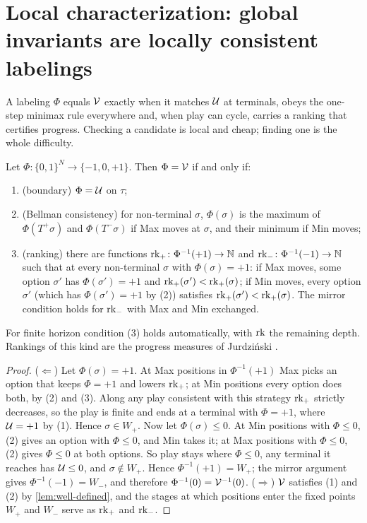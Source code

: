 \section{Local characterization: global invariants are locally consistent labelings}\label{sec:local}

A labeling $\Phi$ equals $\mathcal{V}$ exactly when it matches $\mathcal{U}$ at terminals, obeys the one-step minimax rule everywhere and, when play can cycle, carries a ranking that certifies progress. Checking a candidate is local and cheap; finding one is the whole difficulty.

\begin{theorem}\label{thm:local}
Let $\Phi\colon\{0,1\}^N\to\{-1,0,+1\}$. Then $\Phi=\mathcal{V}$ if and only if:
\begin{enumerate}[label=\textup{(\arabic*)}]
\item \textup{(boundary)} $\Phi=\mathcal{U}$ on $\tau$;
\item \textup{(Bellman consistency)} for non-terminal $\sigma$, $\Phi(\sigma)$ is the maximum of $\Phi(T^{+}\sigma)$ and $\Phi(T^{-}\sigma)$ if Max moves at $\sigma$, and their minimum if Min moves;
\item \textup{(ranking)} there are functions $\operatorname{rk}_{+}\colon\Phi^{-1}(+1)\to\mathbb{N}$ and $\operatorname{rk}_{-}\colon\Phi^{-1}(-1)\to\mathbb{N}$ such that at every non-terminal $\sigma$ with $\Phi(\sigma)=+1$: if Max moves, some option $\sigma'$ has $\Phi(\sigma')=+1$ and $\operatorname{rk}_{+}(\sigma')<\operatorname{rk}_{+}(\sigma)$; if Min moves, every option $\sigma'$ \textup{(}which has $\Phi(\sigma')=+1$ by \textup{(2)}\textup{)} satisfies $\operatorname{rk}_{+}(\sigma')<\operatorname{rk}_{+}(\sigma)$. The mirror condition holds for $\operatorname{rk}_{-}$ with Max and Min exchanged.
\end{enumerate}
For finite horizon condition \textup{(3)} holds automatically, with $\operatorname{rk}$ the remaining depth. Rankings of this kind are the progress measures of Jurdzi\'nski \cite{Jurdzinski}.
\end{theorem}

\begin{proof}
($\Leftarrow$) Let $\Phi(\sigma)=+1$. At Max positions in $\Phi^{-1}(+1)$ Max picks an option that keeps $\Phi=+1$ and lowers $\operatorname{rk}_{+}$; at Min positions every option does both, by (2) and (3). Along any play consistent with this strategy $\operatorname{rk}_{+}$ strictly decreases, so the play is finite and ends at a terminal with $\Phi=+1$, where $\mathcal{U}=+1$ by (1). Hence $\sigma\in W_{+}$.
Now let $\Phi(\sigma)\le 0$. At Min positions with $\Phi\le0$, (2) gives an option with $\Phi\le 0$, and Min takes it; at Max positions with $\Phi\le0$, (2) gives $\Phi\le 0$ at both options. So play stays where $\Phi\le 0$, any terminal it reaches has $\mathcal{U}\le 0$, and $\sigma\notin W_{+}$. Hence $\Phi^{-1}(+1)=W_{+}$; the mirror argument gives $\Phi^{-1}(-1)=W_{-}$, and therefore $\Phi^{-1}(0)=\mathcal{V}^{-1}(0)$.
($\Rightarrow$) $\mathcal{V}$ satisfies (1) and (2) by \cref{lem:well-defined}, and the stages at which positions enter the fixed points $W_{+}$ and $W_{-}$ serve as $\operatorname{rk}_{+}$ and $\operatorname{rk}_{-}$.
\end{proof}

